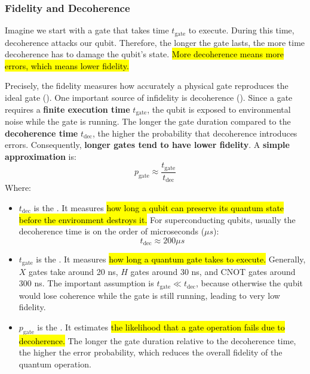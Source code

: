 \subsubsection{Fidelity and Decoherence}\label{sec:fidelity-and-decoherence}

Imagine we start with a gate that takes time $t_{\text{gate}}$ to execute. During this time, decoherence attacks our qubit. Therefore, the longer the gate lasts, the more time decoherence has to damage the qubit's state. \hl{More decoherence means more errors, which means lower fidelity.}

\highspace
Precisely, the fidelity measures how accurately a physical gate reproduces the ideal gate (). One important source of infidelity is decoherence (). Since a gate requires a \textbf{finite execution time} $t_{\text{gate}}$, the qubit is exposed to environmental noise while the gate is running. The longer the gate duration compared to the \textbf{decoherence time} $t_{\text{dec}}$, the higher the probability that decoherence introduces errors. Consequently, \textbf{longer gates tend to have lower fidelity}. A \textbf{simple approximation} is:
\begin{equation}
    p_{\text{gate}} \approx \frac{t_{\text{gate}}}{t_{\text{dec}}}
\end{equation}
Where:
\begin{itemize}
    \item $t_{\text{dec}}$ is the . It measures \hl{how long a qubit can preserve its quantum state before the environment destroys it.} For superconducting qubits, usually the decoherence time is on the order of microseconds ($\mu s$):
    \begin{equation*}
        t_{\text{dec}} \approx 200 \mu s
    \end{equation*}


    \item $t_{\text{gate}}$ is the . It measures \hl{how long a quantum gate takes to execute.} Generally, $X$ gates take around 20 ns, $H$ gates around 30 ns, and CNOT gates around 300 ns. The important assumption is $t_{\text{gate}} \ll t_{\text{dec}}$, because otherwise the qubit would lose coherence while the gate is still running, leading to very low fidelity.
    

    \item $p_{\text{gate}}$ is the . It estimates \hl{the likelihood that a gate operation fails due to decoherence.} The longer the gate duration relative to the decoherence time, the higher the error probability, which reduces the overall fidelity of the quantum operation.
\end{itemize}
